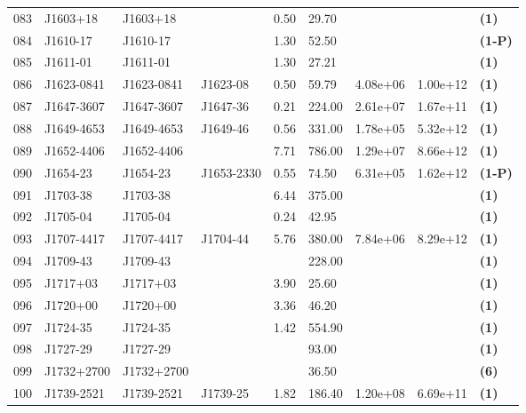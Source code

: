 \documentclass{jaa}
\begin{document}
\begin{table*}
\begin{minipage}{0.95\textwidth}
\begin{tabular}{|l|l|l|l|l|l|l|l|l|}
 083 & J1603+18    & J1603+18    &             &  0.50 &  29.70 &            &          &  {\bf (1)}   \\
 084 & J1610-17    & J1610-17    &             &  1.30 &  52.50 &            &          &  {\bf (1-P)} \\
 085 & J1611-01    & J1611-01    &             &  1.30 &  27.21 &            &          &  {\bf (1)}   \\
 086 & J1623-0841  & J1623-0841  &  J1623-08   &  0.50 &  59.79 &  4.08e+06  & 1.00e+12 &  {\bf (1)}   \\ 
 087 & J1647-3607  & J1647-3607  &  J1647-36   &  0.21 & 224.00 &  2.61e+07  & 1.67e+11 &  {\bf (1)}   \\ 
 088 & J1649-4653  & J1649-4653  &  J1649-46   &  0.56 & 331.00 &  1.78e+05  & 5.32e+12 &  {\bf (1)}   \\
 089 & J1652-4406  & J1652-4406  &             &  7.71 & 786.00 &  1.29e+07  & 8.66e+12 &  {\bf (1)}   \\
 090 & J1654-23    & J1654-23    &  J1653-2330 &  0.55 &  74.50 &  6.31e+05  & 1.62e+12 &  {\bf (1-P)} \\
 091 & J1703-38    & J1703-38    &             &  6.44 & 375.00 &            &          &  {\bf (1)}   \\
 092 & J1705-04    & J1705-04    &             &  0.24 &  42.95 &            &          &  {\bf (1)}   \\
 093 & J1707-4417  & J1707-4417  &  J1704-44   &  5.76 & 380.00 &  7.84e+06  & 8.29e+12 &  {\bf (1)}   \\
 094 & J1709-43    & J1709-43    &             &       & 228.00 &            &          &  {\bf (1)}   \\
 095 & J1717+03    & J1717+03    &             &  3.90 &  25.60 &            &          &  {\bf (1)}   \\
 096 & J1720+00    & J1720+00    &             &  3.36 &  46.20 &            &          &  {\bf (1)}   \\
 097 & J1724-35    & J1724-35    &             &  1.42 & 554.90 &            &          &  {\bf (1)}   \\
 098 & J1727-29    & J1727-29    &             &       &  93.00 &            &          &  {\bf (1)}   \\
 099 & J1732+2700  & J1732+2700  &             &       &  36.50 &            &          &  {\bf (6)}   \\ 
 100 & J1739-2521  & J1739-2521  &  J1739-25   &  1.82 & 186.40 &  1.20e+08  & 6.69e+11 &  {\bf (1)}   \\ \bottomrule
\end{tabular}
%
\end{minipage}
%
\label{t_rrat2}
%
\end{table*}
%
\end{document}
